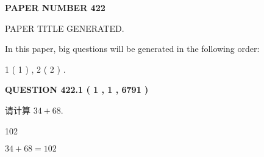 \documentclass{ctexart}
\begin{document}
   
   
   
\newpage 
\setcounter{page}{ 
   422001 } 
   
   
   
   
 {\textbf{ \Large{ PAPER NUMBER  422  }}}
   
   
\vspace{0.2in}
   
   
   
   
   
   
   
   
 \vspace{0.2in}
 
 
 
 
   
   
 PAPER TITLE GENERATED.
   
   
   
\vspace{0.2in}
   
In this paper, big questions will be generated in the following order: 
   
   
   1 ( 1 )
 ,
   2 ( 2 )
 .
  
\vspace{0.2in}
  
{\textbf{\Large{QUESTION
422.1 
 ( 1 , 1 , 6791 )
}}}
  
  
 
请计算 $ %
34 +  %
68 $.
 
 
 
\noindent{}
 
 

102
 
 
\noindent{}
 
 

 
 
 
\noindent{}
 
 

$ %
34 +  %
68=   %
102$
 
 
\noindent{}
 
 

 
   
   
   
\end{document}
